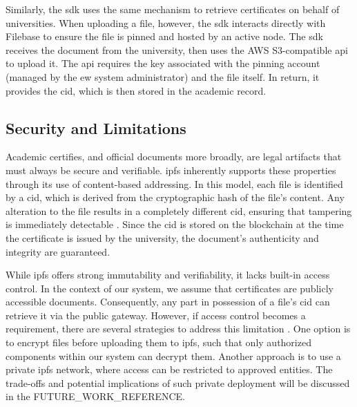 Similarly, the \acrshort{sdk} uses the same mechanism to retrieve certificates on behalf of universities. When uploading a file, however, the \acrshort{sdk} interacts directly with Filebase to ensure the file is pinned and hosted by an active node. The \acrshort{sdk} receives the document from the university, then uses the AWS S3-compatible \acrshort{api} to upload it. The \acrshort{api} requires the key associated with the pinning account (managed by the \acrshort{ew} system administrator) and the file itself. In return, it provides the \acrshort{cid}, which is then stored in the academic record.

\subsection{Security and Limitations}
Academic certifies, and official documents more broadly, are legal artifacts that must always be secure and verifiable. \acrshort{ipfs} inherently supports these properties through its use of content-based addressing. In this model, each file is identified by a \acrshort{cid}, which is derived from the cryptographic hash of the file's content. Any alteration to the file results in a completely different \acrshort{cid}, ensuring that tampering is immediately detectable \cite{benet2014ipfscontentaddressed}. Since the \acrshort{cid} is stored on the blockchain at the time the certificate is issued by the university, the document's authenticity and integrity are guaranteed.

While \acrshort{ipfs} offers strong immutability and verifiability, it lacks built-in access control. In the context of our system, we assume that certificates are publicly accessible documents. Consequently, any part in possession of a file's \acrshort{cid} can retrieve it via the public gateway. However, if access control becomes a requirement, there are several strategies to address this limitation \cite{barbaraanrealaura2021datapersistence}. One option is to encrypt files before uploading them to \acrshort{ipfs}, such that only authorized components within our system can decrypt them. Another approach is to use a private \acrshort{ipfs} network, where access can be restricted to approved entities. The trade-offs and potential implications of such private deployment will be discussed in the FUTURE\_WORK\_REFERENCE.

